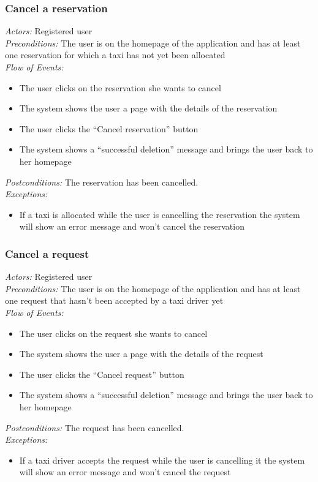 \documentclass{article}
\begin{document}
\subsubsection{Cancel a reservation}
\textit{Actors:} Registered user
\\\textit{Preconditions:} The user is on the homepage of the application and has at least one reservation for which a taxi has not yet been allocated
\\\textit{Flow of Events:}
\begin{itemize}
	\item  The user clicks on the reservation she wants to cancel
	\item  The system shows the user a page with the details of the reservation
	\item  The user clicks the ``Cancel reservation'' button
	\item  The system shows a ``successful deletion'' message and brings the user back to her homepage
\end{itemize}
\textit{Postconditions:} The reservation has been cancelled.
\\\textit{Exceptions:}
\begin{itemize} 
	\item If a taxi is allocated while the user is cancelling the reservation the system will show an error message and won't cancel the reservation
\end{itemize}

\subsubsection{Cancel a request}
\textit{Actors:} Registered user
\\\textit{Preconditions:} The user is on the homepage of the application and has at least one request that hasn't been accepted by a taxi driver yet
\\\textit{Flow of Events:}
\begin{itemize}
	\item  The user clicks on the request she wants to cancel
	\item  The system shows the user a page with the details of the request
	\item  The user clicks the ``Cancel request'' button
	\item  The system shows a ``successful deletion'' message and brings the user back to her homepage
\end{itemize}
\textit{Postconditions:} The request has been cancelled.
\\\textit{Exceptions:}
\begin{itemize} 
	\item If a taxi driver accepts the request while the user is cancelling it the system will show an error message and won't cancel the request
\end{itemize}
\end{document}
